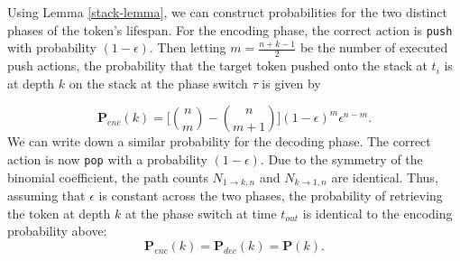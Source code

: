 \documentclass[10pt]{article} %
\begin{document}
Using Lemma \ref{stack-lemma}, we can construct probabilities for the two distinct phases of the token's lifespan. For the encoding phase, the correct action is \texttt{push} with probability $(1-\epsilon)$. Then letting $m= \frac{n+k-1}{2}$ be the number of executed push actions, the probability that the target token pushed onto the stack at $t_i$ is at depth $k$ on the stack at the phase switch $\tau$ is given by

$$
\mathbf{P}_{enc}(k) = \bigg[\binom{n}{m} - \binom{n}{m+1}\bigg](1-\epsilon)^m\epsilon^{n-m}.
$$
We can write down a similar probability for the decoding phase. The correct action is now \texttt{pop} with a probability $(1-\epsilon)$. Due to the symmetry of the binomial coefficient, the path counts $N_{1 \to k, n}$ and $N_{k \to 1, n}$ are identical. Thus, assuming that $\epsilon$ is constant across the two phases, the probability of retrieving the token at depth $k$ at the phase switch at time $t_{out}$ is identical to the encoding probability above:
$$
\mathbf{P}_{enc}(k) = \mathbf{P}_{dec}(k) = \mathbf{P}(k).
$$
\end{document}
